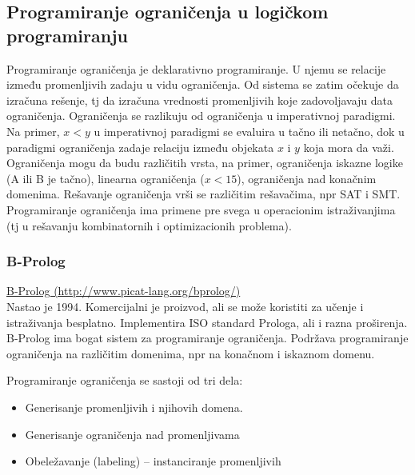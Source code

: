 \documentclass[../main.tex]{subfiles}
\begin{document}
\subsection{Programiranje ograničenja u logičkom programiranju}

Programiranje ograničenja je deklarativno programiranje. U njemu se relacije između promenljivih zadaju u vidu ograničenja. Od sistema se zatim očekuje da izračuna rešenje, tj da izračuna vrednosti promenljivih koje zadovoljavaju data ograničenja. Ograničenja se razlikuju od ograničenja u imperativnoj paradigmi. Na primer, $x<y$ u imperativnoj paradigmi se evaluira u tačno ili netačno, dok u paradigmi ograničenja zadaje relaciju između objekata $x$ i $y$ koja mora da važi. 
\\
Ograničenja mogu da budu različitih vrsta, na primer, ograničenja iskazne logike (A ili B je tačno), linearna ograničenja ($x<15$), ograničenja nad konačnim domenima. Rešavanje ograničenja vrši se različitim rešavačima, npr SAT i SMT. Programiranje ograničenja ima primene pre svega u operacionim istraživanjima (tj u rešavanju kombinatornih i optimizacionih problema). 

\subsubsection{B-Prolog}

\href{http://www.picat-lang.org/bprolog/}{B-Prolog (http://www.picat-lang.org/bprolog/)}\\
Nastao je 1994. Komercijalni je proizvod, ali se može koristiti za učenje i istraživanja besplatno. Implementira ISO standard Prologa, ali i razna proširenja. B-Prolog ima bogat sistem za programiranje ograničenja. Podržava programiranje ograničenja na različitim domenima, npr na konačnom i iskaznom domenu.

Programiranje ograničenja se sastoji od tri dela:
\begin{itemize}
\item Generisanje promenljivih i njihovih domena.
\item Generisanje ograničenja nad promenljivama
\item Obeležavanje (labeling) -- instanciranje promenljivih
\end{itemize}
\end{document}
